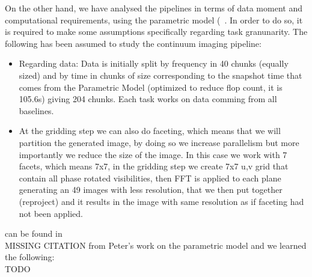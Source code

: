 On the other hand, we have analysed the pipelines in terms of data moment and computational requirements, using 
the parametric model (~\cite{ParametricModel}. In order to do so, it is required to make some assumptions specifically regarding
task granunarity. The following has been assumed to study the continuum imaging pipeline:
\begin{itemize}
\item Regarding data: Data is initially split by frequency in 40 chunks (equally sized) and by time in chunks of size corresponding to the snapshot time
that comes from the Parametric Model (optimized to reduce flop count, it is 105.6s) giving 204 chunks. Each task works on data comming from all baselines.
\item At the gridding step we can also do faceting, which means that we will partition the generated image, by doing so we increase parallelism but more
importantly we reduce the size of the image. In this case we work with 7 facets, which means 7x7, in the gridding step we create 7x7 u,v grid that contain
all phase rotated visibilities, then FFT is applied to each plane generating an 49 images with less resolution, that we then put together (reproject) and it
results in the image with same resolution as if faceting had not been applied. 
\end{itemize}
can be found in \\ MISSING CITATION from Peter's work on the parametric model
and we learned the following:  \\ TODO





